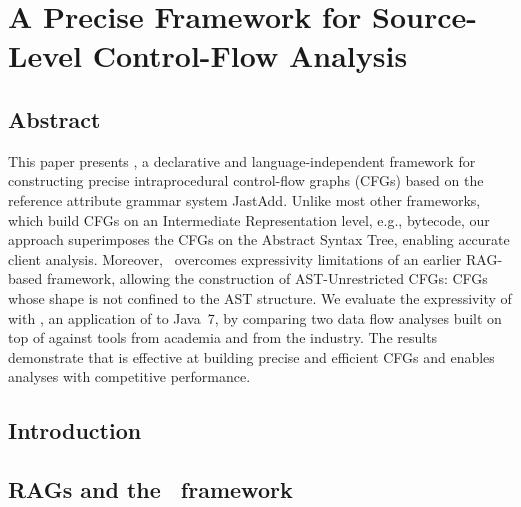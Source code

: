 

\chapter[A Precise Framework for Source-Level Control-Flow Analysis]{\texorpdfstring{%
A Precise Framework for Source-Level Control-Flow Analysis}{%
A Precise Framework for Source-Level Control-Flow Analysis}}

\paperRemark{\paperIref}





\section{Abstract}
This paper presents \intracfg, a declarative and language-independent framework for constructing precise intraprocedural control-flow graphs (CFGs) based on the reference attribute grammar system JastAdd. Unlike most other frameworks, which build CFGs on an Intermediate Representation level, e.g., bytecode,  our approach superimposes the CFGs on the Abstract Syntax Tree, enabling accurate client analysis.
Moreover, \intracfg\ overcomes expressivity limitations of an earlier RAG-based framework, allowing the construction of AST-Unrestricted CFGs: CFGs whose shape is not confined to the AST structure.
We evaluate the expressivity of {\intracfg} with {\intraj}, an application of {\intracfg} to Java~7,
by comparing two data flow analyses built on top of {\intraj} against tools from academia and from the industry.
The results demonstrate that {\intraj} is effective at building precise and efficient CFGs and enables analyses with competitive performance.




\section{Introduction}
\label{sec:introduction}



\section{RAGs and the \intracfg\ framework}
\label{sec:framework}



